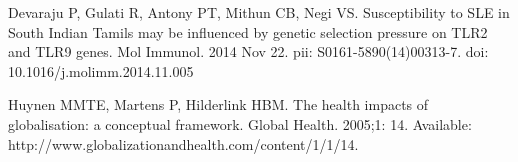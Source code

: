 \documentclass[10pt,letterpaper]{article}
\begin{document}
\nolinenumbers

%
%
% 
\begin{thebibliography}{10}
Devaraju P, Gulati R, Antony PT, Mithun CB, Negi VS. Susceptibility to SLE in South Indian Tamils may be influenced by genetic selection pressure on TLR2 and TLR9 genes. Mol Immunol. 2014 Nov 22. pii: S0161-5890(14)00313-7. doi: 10.1016/j.molimm.2014.11.005

Huynen MMTE, Martens P, Hilderlink HBM. The health impacts of globalisation: a conceptual framework. Global Health. 2005;1: 14. Available: http://www.globalizationandhealth.com/content/1/1/14.

\end{thebibliography}
\end{document}
